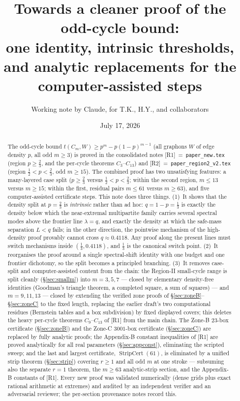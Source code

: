 \documentclass[11pt]{article}
\title{Towards a cleaner proof of the odd-cycle bound:\\
one identity, intrinsic thresholds,\\ and analytic replacements for the computer-assisted steps}
\author{Working note by Claude, for T.K., H.Y., and collaborators}
\date{July 17, 2026}
\theoremstyle{remark}
\theoremstyle{plain}
\theoremstyle{plain}
\begin{document}
\maketitle

\begin{abstract}
The odd-cycle bound $t(C_m,W)\ge p^m-p(1-p)^{m-1}$ (all graphons $W$ of edge
density $p$, all odd $m\ge3$) is proved in the consolidated notes
[R1]~=~\texttt{paper\_new.tex} (region $p\ge\tfrac23$, and the per-cycle
theorems $C_3$--$C_{13}$) and [R2]~=~\texttt{paper\_region2\_v2.tex} (region
$\tfrac12<p<\tfrac23$, odd $m\ge15$).  The combined proof has two
unsatisfying features: a many-layered case split ($p\ge\tfrac23$ versus
$\tfrac12<p<\tfrac23$; within the second region, $m\le13$ versus $m\ge15$;
within the first, residual pairs $m\le61$ versus $m\ge63$), and five
computer-assisted certificate steps.  This note does three things.
(1)~It shows that the density split at $p=\tfrac23$ is \emph{intrinsic}
rather than ad hoc: $q=1-p=\tfrac13$ is exactly the density below which the
near-extremal multipartite family carries several spectral modes above the
frontier line $\lambda=q$, and exactly the density at which the safe-mass
separation $L<q$ fails; in the other direction, the pointwise mechanism of
the high-density proof provably cannot cross $q\approx0.4118$.  Any proof
along the present lines must switch mechanisms inside $(\tfrac13,0.4118)$,
and $\tfrac13$ is the canonical switch point.
(2)~It reorganises the proof around a single spectral-shift identity with
one budget and one frontier dichotomy, so the split becomes a principled
branching.
(3)~It removes case-split and computer-assisted content from the chain:
the Region-II small-cycle range is split cleanly (\S\ref{sec:smallm}) into
$m=3,5,7$ --- closed by elementary density-free identities (Goodman's
triangle theorem, a completed square, a sum of squares) --- and
$m=9,11,13$ --- closed by extending the verified zone proofs of
\S\ref{sec:zoneB}--\S\ref{sec:zoneC} to the fixed length, replacing the
earlier draft's two computational residues (Bernstein tables and a box
subdivision) by fixed displayed covers; this deletes the heavy per-cycle
theorems $C_9$--$C_{13}$ of [R1] from the main chain.  The Zone-B $23$-box
certificate
(\S\ref{sec:zoneB}) and the Zone-C $3001$-box certificate
(\S\ref{sec:zoneC}) are replaced by fully analytic proofs; the
Appendix-B constant inequalities of [R1] are proved analytically for all
real parameters (\S\ref{sec:appconst}), eliminating the scripted sweep;
and the last and largest certificate, $\operatorname{StripCert}(61)$, is
eliminated by a unified strip theorem (\S\ref{sec:strip}) covering
$r\ge1$ and all odd $m$ at one stroke --- subsuming also the separate
$r=1$ theorem, the $m\ge63$ analytic-strip section, and the Appendix-B
constants of [R1].
Every new proof was validated numerically (dense grids plus exact rational
arithmetic at extremes) and audited by an independent verifier and an
adversarial reviewer; the per-section provenance notes record this.
\end{abstract}
\end{document}
